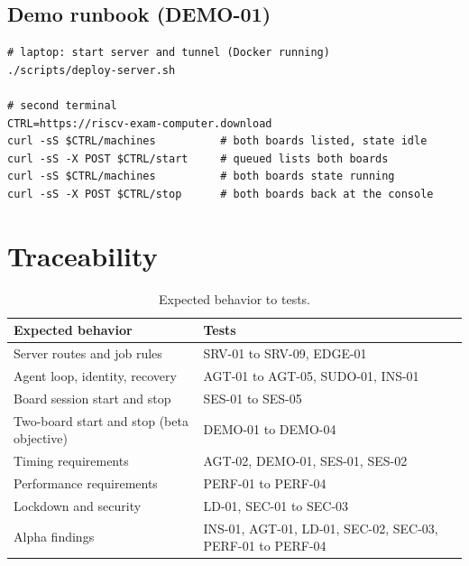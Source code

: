\documentclass[11pt]{article}
\begin{document}
\subsection{Demo runbook (DEMO-01)}

\begin{lstlisting}
# laptop: start server and tunnel (Docker running)
./scripts/deploy-server.sh

# second terminal
CTRL=https://riscv-exam-computer.download
curl -sS $CTRL/machines          # both boards listed, state idle
curl -sS -X POST $CTRL/start     # queued lists both boards
curl -sS $CTRL/machines          # both boards state running
curl -sS -X POST $CTRL/stop      # both boards back at the console
\end{lstlisting}

\section{Traceability}

\begin{table}[H]
  \centering
  \footnotesize
  \begin{tabularx}{\textwidth}{@{}p{}X@{}}
    \toprule
    \textbf{Expected behavior} & \textbf{Tests} \\
    \midrule
    Server routes and job rules & SRV-01 to SRV-09, EDGE-01 \\
    Agent loop, identity, recovery & AGT-01 to AGT-05, SUDO-01, INS-01 \\
    Board session start and stop & SES-01 to SES-05 \\
    Two-board start and stop (beta objective) & DEMO-01 to DEMO-04 \\
    Timing requirements & AGT-02, DEMO-01, SES-01, SES-02 \\
    Performance requirements & PERF-01 to PERF-04 \\
    Lockdown and security & LD-01, SEC-01 to SEC-03 \\
    Alpha findings & INS-01, AGT-01, LD-01, SEC-02, SEC-03, PERF-01 to PERF-04 \\
    \bottomrule
  \end{tabularx}
  \caption{Expected behavior to tests.}
  \label{tab:trace}
\end{table}

\end{document}
